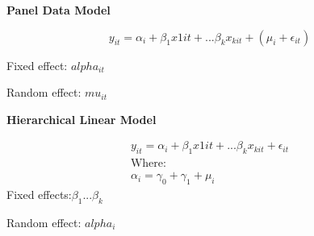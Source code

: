 \documentclass{article}
\begin{document}
\textbf{Panel Data Model}

\begin{equation}
  y_{it}=\alpha_i+\beta_1x{1it}+...\beta_kx_{kit}+(\mu_i+\epsilon_{it})
\end{equation}

Fixed effect: $alpha_{it}$

Random effect: $mu_{it}$



\textbf{Hierarchical Linear Model}

\begin{multline}
  y_{it}=\alpha_i+ \beta_1x{1it}+...\beta_kx_{kit}+\epsilon_{it}\\
  \text{Where:}\\
  \alpha_i=\gamma_0+\gamma_1+\mu_i
\end{multline}
Fixed effects:$\beta_1...\beta_k$

Random effect: $alpha_i$
\end{document}
